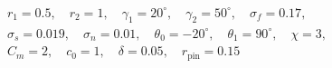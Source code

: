 $$
\begin{gathered}
r_1 = 0.5,\quad r_2 = 1,\quad \gamma_1 = 20^\circ,\quad \gamma_2 = 50^\circ,\quad \sigma_f = 0.17,\\
\sigma_s = 0.019,\quad \sigma_n = 0.01,\quad \theta_0 = -20^\circ,\quad \theta_1 = 90^\circ,\quad \chi = 3,\\
C_m = 2,\quad c_0 = 1,\quad \delta = 0.05,\quad r_{\mathrm{pin}} = 0.15
\end{gathered}
$$
